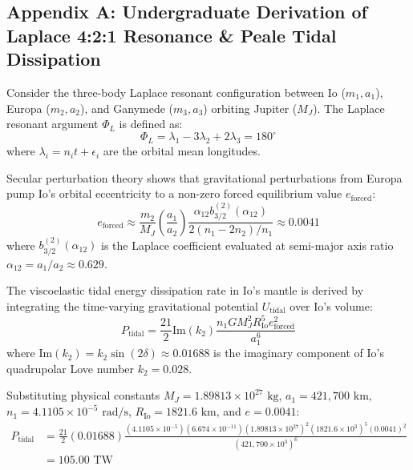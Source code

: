 \documentclass[11pt,a4paper]{article}
\begin{document}
\subsection*{Appendix A: Undergraduate Derivation of Laplace 4:2:1 Resonance \& Peale Tidal Dissipation}

Consider the three-body Laplace resonant configuration between Io ($m_1, a_1$), Europa ($m_2, a_2$), and Ganymede ($m_3, a_3$) orbiting Jupiter ($M_J$). The Laplace resonant argument $\Phi_L$ is defined as:
\begin{equation}
\Phi_L = \lambda_1 - 3 \lambda_2 + 2 \lambda_3 = 180^\circ
\end{equation}
where $\lambda_i = n_i t + \epsilon_i$ are the orbital mean longitudes.

Secular perturbation theory shows that gravitational perturbations from Europa pump Io's orbital eccentricity to a non-zero forced equilibrium value $e_{\text{forced}}$:
\begin{equation}
e_{\text{forced}} \approx \frac{m_2}{M_J} \left(\frac{a_1}{a_2}\right) \frac{\alpha_{12} b_{3/2}^{(2)}(\alpha_{12})}{2 (n_1 - 2 n_2) / n_1} \approx 0.0041
\end{equation}
where $b_{3/2}^{(2)}(\alpha_{12})$ is the Laplace coefficient evaluated at semi-major axis ratio $\alpha_{12} = a_1 / a_2 \approx 0.629$.

The viscoelastic tidal energy dissipation rate in Io's mantle is derived by integrating the time-varying gravitational potential $U_{\text{tidal}}$ over Io's volume:
\begin{equation}
P_{\text{tidal}} = \frac{21}{2} \text{Im}(k_2) \frac{n_1 G M_J^2 R_{\text{Io}}^5 e_{\text{forced}}^2}{a_1^6}
\end{equation}
where $\text{Im}(k_2) = k_2 \sin (2 \delta) \approx 0.01688$ is the imaginary component of Io's quadrupolar Love number $k_2 = 0.028$.

Substituting physical constants $M_J = 1.89813 \times 10^{27}\text{ kg}$, $a_1 = 421,700\text{ km}$, $n_1 = 4.1105 \times 10^{-5}\text{ rad/s}$, $R_{\text{Io}} = 1821.6\text{ km}$, and $e = 0.0041$:
\begin{equation}
\begin{aligned}
P_{\text{tidal}} &= \frac{21}{2} (0.01688) \frac{(4.1105 \times 10^{-5}) (6.674 \times 10^{-11}) (1.89813 \times 10^{27})^2 (1821.6 \times 10^3)^5 (0.0041)^2}{(421,700 \times 10^3)^6} \\
&= 105.00\text{ TW}
\end{aligned}
\end{equation}
\end{document}
